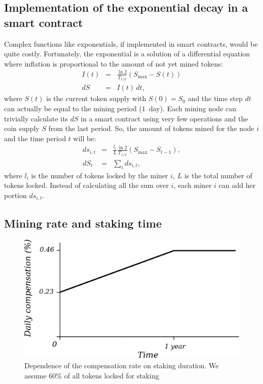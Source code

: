 \documentclass[longbibliography,nofootinbib,twocolumn]{revtex4-1}
\begin{document}
\subsection{Implementation of the exponential decay in a smart contract}

Complex functions like exponentials, if implemented in smart contracts, would be quite costly.
Fortunately, the exponential is a solution of a differential equation where inflation is proportional to the amount of not yet mined tokens:
\begin{eqnarray}
    I(t) &=& \frac{\ln{2}}{T_{1/2}} \left( S_{\max} - S(t) \right)\\
    dS &=& I(t)\, dt,
\end{eqnarray}
where $S(t)$ is the current token supply with $S(0)=S_0$ and the time step $dt$ can actually be equal to the mining period ($1$~day).
Each mining node can trivially calculate its $dS$ in a smart contract using very few operations and the coin supply $S$ from the last period.
So, the amount of tokens mined for the node $i$ and the time period $t$ will be:
\begin{eqnarray}
    \label{eq:rate-max}
    ds_{i,t} &=& \frac{l_i}{L} \frac{\ln{2}}{T_{1/2}} \left( S_{\max} - S_{t-1} \right),\\
    dS_t &=& \sum_i ds_{i,t},
\end{eqnarray}
where $l_i$ is the number of tokens locked by the miner $i$, $L$ is the total number of tokens locked.
Instead of calculating all the sum over $i$, each miner $i$ can add her portion $ds_{i,t}$.

\subsection{Mining rate and staking time}

\begin{figure}
    \includegraphics[width=\columnwidth]{pdf/rate.pdf}
    \caption{Dependence of the compensation rate on staking duration. We assume $60\%$ of all tokens locked for staking}
    \label{fig:reward-rate-vs-duration}
\end{figure}
\end{document}
